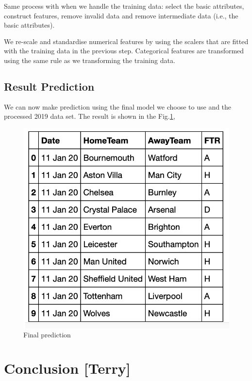 \documentclass{article}
\begin{document}
Same process with when we handle the training data: select the basic attributes, construct features, remove invalid data and remove intermediate data (i.e., the basic attributes).

We re-scale and standardise numerical features by using the scalers that are fitted with the training data in the previous step. Categorical features are transformed using the same rule as we transforming the training data.

\subsection{Result Prediction}
We can now make prediction using the final model we choose to use and the processed 2019 data set. The result is shown in the Fig.\ref{fig:finalPrediction},
\begin{figure}[ht]
\centering
\includegraphics[scale=0.5]{graphs/finalPrediction.png}
\caption{Final prediction}
\label{fig:finalPrediction}
\end{figure}

\section{Conclusion [Terry]}
\end{document}
